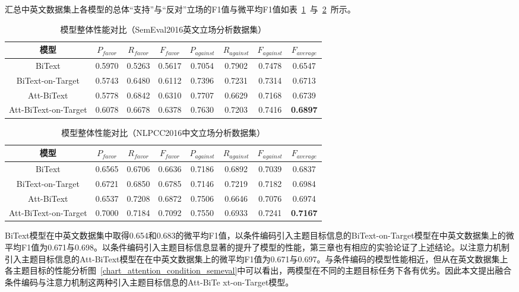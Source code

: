 汇总中英文数据集上各模型的总体“支持”与“反对”立场的F1值与微平均F1值如表~\ref{semeval_all_model1}~与~\ref{nlcpp_all_model1}~所示。
\begin{table}[htbp]
	\caption[table123]{模型整体性能对比（SemEval2016英文立场分析数据集）}
	\label{semeval_all_model1}
	\vspace{0.5em}\centering\wuhao
	\begin{tabular}{cccccccc}
		\toprule[1.5pt]
		模型& $P_{favor}$&$R_{favor}$&$F_{favor}$&$P_{against}$&$R_{against}$&$F_{against}$&$F_{average}$ \\
		\midrule[1pt]
		BiText&0.5970&0.5263&0.5617&0.7054&0.7902&0.7478&0.6547\\
		BiText-on-Target&0.5743&0.6480&0.6112&0.7396&0.7231&0.7314&0.6713\\
		Att-BiText&0.5778&0.6842&0.6310&0.7707&0.6629&0.7168&0.6739\\
		Att-BiText-on-Target&0.6078&0.6678&0.6378&0.7630&0.7203&0.7416&\textbf{0.6897}\\
		\bottomrule[1.5pt]
	\end{tabular}
\end{table}

\begin{table}[htbp]
	\caption[table123]{模型整体性能对比（NLPCC2016中文立场分析数据集）}
	\label{nlcpp_all_model1}
	\vspace{0.5em}\centering\wuhao
	\begin{tabular}{cccccccc}
		\toprule[1.5pt]
		模型& $P_{favor}$&$R_{favor}$&$F_{favor}$&$P_{against}$&$R_{against}$&$F_{against}$&$F_{average}$ \\
		\midrule[1pt]
		BiText&0.6565&0.6706&0.6636&0.7186&0.6892&0.7039&0.6837\\
		BiText-on-Target&0.6721&0.6850&0.6785&0.7146&0.7219&0.7182&0.6984\\
		Att-BiText&0.6537&0.7208&0.6872&0.7506&0.6646&0.7076&0.6974\\
		Att-BiText-on-Target&0.7000&0.7184&0.7092&0.7550&0.6933&0.7241&\textbf{0.7167}\\
		\bottomrule[1.5pt]
	\end{tabular}
\end{table}

BiText模型在中英文数据集中取得0.654和0.683的微平均F1值，以条件编码引入主题目标信息的BiText-on-Target模型在中英文数据集上的微平均F1值为0.671与0.698。以条件编码引入主题目标信息显著的提升了模型的性能，第三章也有相应的实验论证了上述结论。以注意力机制引入主题目标信息的Att-BiText模型在在中英文数据集上的微平均F1值为0.671与0.697。与条件编码的模型性能相近，但从在英文数据集上各主题目标的性能分析图~\ref{chart_attention_condition_semeval}中可以看出，两模型在不同的主题目标任务下各有优劣。因此本文提出融合条件编码与注意力机制这两种引入主题目标信息的Att-BiTe   xt-on-Target模型。

